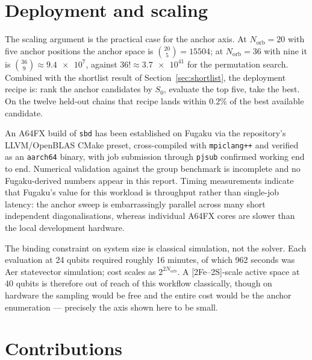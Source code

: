 \documentclass[11pt,a4paper]{article}
\begin{document}
\section{Deployment and scaling}

The scaling argument is the practical case for the anchor axis. At
$N_{\text{orb}}=20$ with five anchor positions the anchor space is
$\binom{20}{5}=\num{15504}$; at $N_{\text{orb}}=36$ with nine it is
$\binom{36}{9}\approx\num{9.4e7}$, against $36!\approx\num{3.7e41}$ for the
permutation search. Combined with the shortlist result of
Section~\ref{sec:shortlist}, the deployment recipe is: rank the anchor
candidates by $S_0$, evaluate the top five, take the best. On the twelve
held-out chains that recipe lands within 0.2\% of the best available
candidate.

An A64FX build of \texttt{sbd} has been established on Fugaku via the
repository's LLVM/OpenBLAS CMake preset, cross-compiled with
\texttt{mpiclang++} and verified as an \texttt{aarch64} binary, with job
submission through \texttt{pjsub} confirmed working end to end. Numerical
validation against the group benchmark is incomplete and no Fugaku-derived
numbers appear in this report. Timing measurements indicate that Fugaku's
value for this workload is throughput rather than single-job latency: the
anchor sweep is embarrassingly parallel across many short independent
diagonalisations, whereas individual A64FX cores are slower than the local
development hardware.

The binding constraint on system size is classical simulation, not the
solver. Each  evaluation at 24 qubits required roughly 16 minutes, of
which 962 seconds was Aer statevector simulation; cost scales as
$2^{2N_{\text{orb}}}$. A [2Fe--2S]-scale active space at 40 qubits is
therefore out of reach of this workflow classically, though on hardware the
sampling would be free and the entire cost would be the anchor enumeration
--- precisely the axis shown here to be small.

\FloatBarrier
\section{Contributions}
\end{document}

